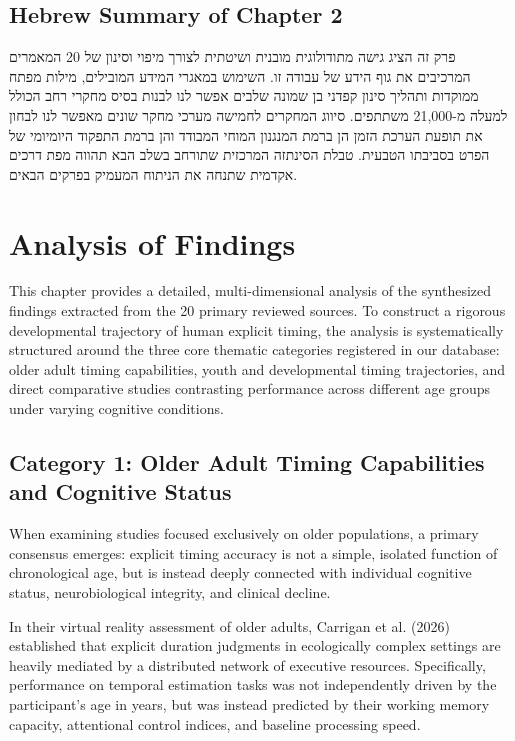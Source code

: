 \documentclass{custom_report}
\begin{document}
\section{Hebrew Summary of Chapter 2}
פרק זה הציג גישה מתודולוגית מובנית ושיטתית לצורך מיפוי וסינון של 20 המאמרים המרכיבים את גוף הידע של עבודה זו. השימוש במאגרי המידע המובילים, מילות מפתח ממוקדות ותהליך סינון קפדני בן שמונה שלבים אפשר לנו לבנות בסיס מחקרי רחב הכולל למעלה מ-21,000 משתתפים. סיווג המחקרים לחמישה מערכי מחקר שונים מאפשר לנו לבחון את תופעת הערכת הזמן הן ברמת המנגנון המוחי המבודד והן ברמת התפקוד היומיומי של הפרט בסביבתו הטבעית. טבלת הסינתזה המרכזית שתורחב בשלב הבא תהווה מפת דרכים אקדמית שתנחה את הניתוח המעמיק בפרקים הבאים.

\clearpage

\chapter{Analysis of Findings}
\label{ch:analysis}

This chapter provides a detailed, multi-dimensional analysis of the synthesized findings extracted from the 20 primary reviewed sources. To construct a rigorous developmental trajectory of human explicit timing, the analysis is systematically structured around the three core thematic categories registered in our database: older adult timing capabilities, youth and developmental timing trajectories, and direct comparative studies contrasting performance across different age groups under varying cognitive conditions.

\section{Category 1: Older Adult Timing Capabilities and Cognitive Status}
When examining studies focused exclusively on older populations, a primary consensus emerges: explicit timing accuracy is not a simple, isolated function of chronological age, but is instead deeply connected with individual cognitive status, neurobiological integrity, and clinical decline. 

In their virtual reality assessment of older adults, Carrigan et al. (2026) established that explicit duration judgments in ecologically complex settings are heavily mediated by a distributed network of executive resources. Specifically, performance on temporal estimation tasks was not independently driven by the participant's age in years, but was instead predicted by their working memory capacity, attentional control indices, and baseline processing speed. 
\end{document}
